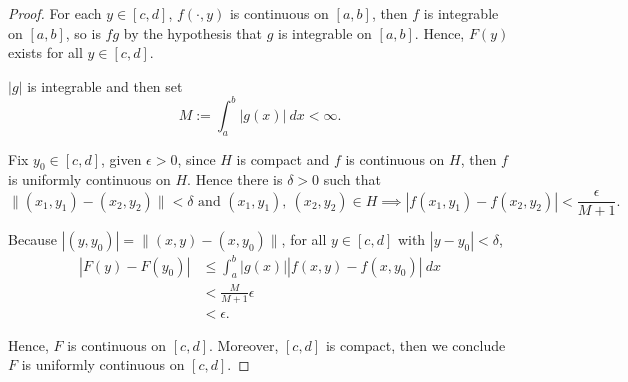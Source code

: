 \begin{Exercise}
\begin{proof}
For each $y\in[c,d]$, $f(\cdot, y)$ is continuous on $[a,b]$, then $f$ is integrable on $[a,b]$, so is $fg$ by the hypothesis that $g$ is integrable on $[a,b]$. Hence, $F(y)$ exists for all $y\in[c,d]$.

$|g|$ is integrable and then set
$$
M := \int_{a}^{b} |g(x)|\ dx < \infty.
$$

Fix $y_0\in[c,d]$, given $\epsilon>0$, since $H$ is compact and $f$ is continuous on $H$, then $f$ is uniformly continuous on $H$. Hence there is $\delta >0$ such that
$$
\| (x_1,y_1) - (x_2,y_2) \| < \delta \text{ and } (x_1,y_1),\ (x_2,y_2)\in H
\implies \left| f(x_1,y_1)-f(x_2,y_2) \right| < \frac{\epsilon}{M+1}.
$$

Because $|(y,y_0)| = \| (x,y)-(x,y_0) \|$, for all $y\in[c,d]$ with $|y-y_0|<\delta$,
\begin{align*}
\left| F(y) - F(y_0) \right|
&\leq \int_{a}^{b} |g(x)| |f(x,y) - f(x,y_0)|\ dx \\
&< \frac{M}{M+1}\epsilon \\
&< \epsilon.
\end{align*}

Hence, $F$ is continuous on $[c,d]$. Moreover, $[c,d]$ is compact, then we conclude $F$ is uniformly continuous on $[c,d]$.
\end{proof}
\end{Exercise}